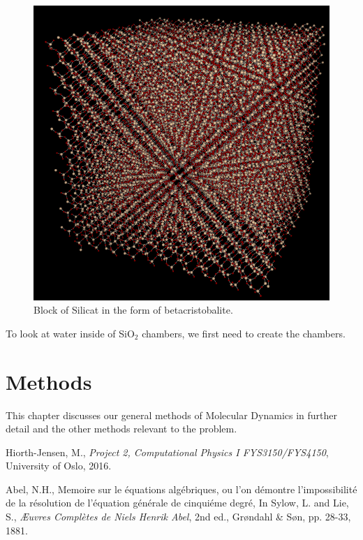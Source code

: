 \documentclass[10pt, a4paper]{report}
\begin{document}
\begin{figure}[h] 

 \includegraphics[scale=0.35]{block}\centering
 \caption{\label{fig:pores}Block of Silicat in the form of betacristobalite.}
 
\end{figure}


To look at water inside of SiO$_2$ chambers, we first need to create the chambers.



\chapter{Methods}

This chapter discusses our general methods of Molecular Dynamics in further detail and the other methods relevant to the problem.


\begin{thebibliography}{9}

	Hiorth-Jensen, M.,
	\emph{Project 2, Computational Physics I FYS3150/FYS4150},
	University of Oslo,
	2016.
	
	Abel, N.H.,
	Memoire sur le équations algébriques, ou l'on démontre l'impossibilité de la résolution de l'équation générale de cinquiéme degré,
	In Sylow, L. and Lie, S., 
	\emph{Æuvres Complètes de Niels Henrik Abel}, 2nd ed.,
	Grøndahl \& Søn, pp. 28-33,
	1881.

\end{thebibliography}
\end{document}
